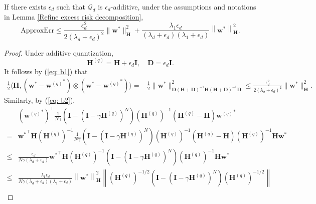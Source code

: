 \documentclass[11pt, letterpaper]{article}
\begin{document}
\begin{lemma}
    \label{lem: b2}
    If there exists $\epsilon_d$ such that $\mathcal{Q}_d$ is $\epsilon_d$-additive, under the assumptions and notations in Lemma \ref{Refine excess risk decomposition}, 
    \begin{equation*}
        \mathrm{ApproxErr}\leq \frac{\epsilon_d^2}{2(\lambda_d+\epsilon_d)^2}\|\mathbf{w}^*\|_\mathbf{H}^2+\frac{\lambda_1\epsilon_d}{(\lambda_d+\epsilon_d)(\lambda_1+\epsilon_d)}\left\|\mathbf{w}^*\right\|_\mathbf{H}^2.
    \end{equation*}
\end{lemma}
\begin{proof}
    Under additive quantization, 
    \begin{equation*}
        \mathbf{H}^{(q)}=\mathbf{H}+\epsilon_d\mathbf{I}, \quad \mathbf{D}=\epsilon_d\mathbf{I}.
    \end{equation*}
    It follows by (\ref{eq: b1}) that 
    \begin{equation*}
        \begin{aligned}
            \frac{1}{2}\langle\mathbf{H},({\mathbf{w}}^*-{\mathbf{w}^{(q)}}^*)\otimes({\mathbf{w}}^*-{\mathbf{w}^{(q)}}^*)\rangle=&\frac{1}{2}\|\mathbf{w}^*\|_{\mathbf{D}(\mathbf{H}+\mathbf{D})^{-1}\mathbf{H}(\mathbf{H}+\mathbf{D})^{-1}\mathbf{D}}^2\leq\frac{\epsilon_d^2}{2(\lambda_d+\epsilon_d)^2}\|\mathbf{w}^*\|_\mathbf{H}^2.
        \end{aligned}
    \end{equation*}
    Similarly, by (\ref{eq: b2}),
    \begin{equation*}
        \begin{aligned}
            &\left({\mathbf{w}^{(q)}}^*\right)^\top\frac{1}{N\gamma}\left(\mathbf{I}-(\mathbf{I}-\gamma\mathbf{H}^{(q)})^N\right)(\mathbf{H}^{(q)})^{-1}\left(\mathbf{H}^{(q)}-\mathbf{H}\right){\mathbf{w}^{(q)}}^*\\
            =&{\mathbf{w}^*}^\top \mathbf{H}(\mathbf{H}^{(q)})^{-1}\frac{1}{N\gamma}\left(\mathbf{I}-(\mathbf{I}-\gamma\mathbf{H}^{(q)})^N\right)(\mathbf{H}^{(q)})^{-1}\left(\mathbf{H}^{(q)}-\mathbf{H}\right)(\mathbf{H}^{(q)})^{-1}\mathbf{H}\mathbf{w}^*\\
            \leq&\frac{\epsilon_d}{N\gamma(\lambda_d+\epsilon_d)}{\mathbf{w}^*}^\top \mathbf{H}(\mathbf{H}^{(q)})^{-1}\left(\mathbf{I}-(\mathbf{I}-\gamma\mathbf{H}^{(q)})^N\right)(\mathbf{H}^{(q)})^{-1}\mathbf{H}\mathbf{w}^*\\
            \leq& \frac{\lambda_1\epsilon_d}{N\gamma(\lambda_d+\epsilon_d)(\lambda_1+\epsilon_d)} \left\|\mathbf{w}^*\right\|_\mathbf{H}^2\left\|(\mathbf{H}^{(q)})^{-1/2}\left(\mathbf{I}-(\mathbf{I}-\gamma\mathbf{H}^{(q)})^N\right)(\mathbf{H}^{(q)})^{-1/2}\right\|\\

\end{aligned}
\end{equation*}
\end{proof}
\end{document}
